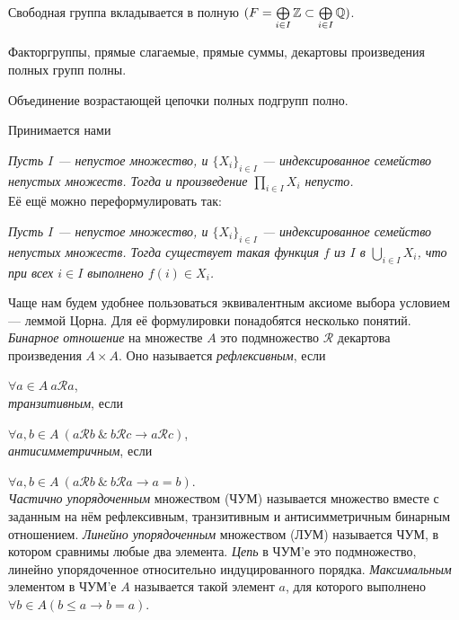 \documentclass[10pt,a4paper]{article}%
\begin{document}
\begin{stm} Свободная группа вкладывается в полную
$(F=\bigoplus\limits_{i\in I}\mathbb Z\subset\bigoplus\limits_{i\in
I}\mathbb Q)$.
\end{stm}

\begin{stm} Факторгруппы, прямые слагаемые, прямые суммы,
декартовы произведения полных групп полны.
\end{stm}

\begin{stm}
Объединение возрастающей цепочки полных подгрупп полно.
\end{stm}

Принимается нами

\vskip 2pt
{\sl Пусть $I$
--- непустое множество, и $\{X_i\}_{i\in I}$ --- индексированное
семейство непустых множеств. Тогда и произведение
$\prod\limits_{i\in I}X_i$ непусто.}
\\ Её ещё можно переформулировать так:
\par {\sl Пусть $I$ --- непустое множество, и $\{X_i\}_{i\in I}$ ---
индексированное семейство непустых множеств. Тогда существует
такая функция $f$ из $I$ в $\bigcup\limits_{i\in I}X_i$, что при
всех $i\in I$ выполнено $f(i)\in X_i$.}

Чаще нам будем удобнее пользоваться эквивалентным аксиоме выбора
условием --- леммой Цорна. Для её формулировки понадобятся
несколько понятий. \emph{Бинарное
отношение} на множестве $A$ это
подмножество $\mathcal{R}$ декартова произведения $A\times A$. Оно
называется {\em рефлексивным}, если

\hfil$\forall a\in A~a\mathcal{R}a$,\hfil\\ {\em
транзитивным}, если

\hfil$\forall a,b\in A~
(a\mathcal{R}b~\&~b\mathcal{R}c\rightarrow a\mathcal{R}c)$,\hfil\\
{\em антисимметричным}, если

\hfil$\forall a,b\in A~ (a\mathcal{R}b~\&~
b\mathcal{R}a\rightarrow a=b)$.\hfil\\ {\em Частично
упорядоченным}
множеством (ЧУМ) называется множество вместе с заданным на нём
рефлексивным, транзитивным и антисимметричным бинарным отношением.
{\em Линейно упорядоченным} множеством (ЛУМ) называется ЧУМ, в котором сравнимы любые
два элемента. {\em Цепь} в ЧУМ'е это подмножество,
линейно упорядоченное относительно индуцированного порядка. {\em
Максимальным} элементом в ЧУМ'е $A$
называется такой элемент $a$, для которого выполнено $\forall b\in
A (b\leqslant a \rightarrow b=a)$.
\end{document}
